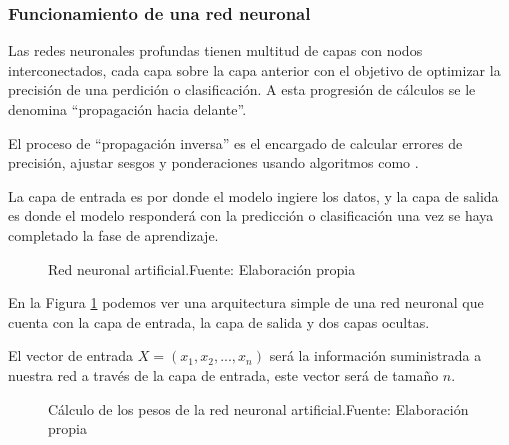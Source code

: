 


\subsubsection{Funcionamiento de una red neuronal} \label{neural-network}

Las redes neuronales profundas tienen multitud de capas con nodos interconectados, cada capa sobre la capa anterior con el objetivo de optimizar la precisión de una perdición o clasificación. A esta progresión de cálculos se le denomina ``propagación hacia delante''.

El proceso de ``propagación inversa'' es el encargado de calcular errores de precisión, ajustar sesgos y ponderaciones usando algoritmos como .

La capa de entrada es por donde el modelo ingiere los datos, y la capa de salida es donde el modelo responderá con la predicción o clasificación una vez se haya completado la fase de aprendizaje.

\begin{figure}[H]
    \centering
    \centerline{}
    \caption{Red neuronal artificial.\newline{}Fuente: Elaboración propia}
    \label{fig:artificial-neuronal-network}
\end{figure}

En la Figura \ref{fig:artificial-neuronal-network} podemos ver una arquitectura simple de una red neuronal que cuenta con la capa de entrada, la capa de salida y dos capas ocultas.

El vector de entrada ${X = (x_{1}, x_{2}, ..., x_{n})}$ será la información suministrada a nuestra red a través de la capa de entrada, este vector será de tamaño ${n}$.

\begin{figure}[H]
    \centering
    \captionsetup{justification=centering}
    \centerline{}
    \caption{Cálculo de los pesos de la red neuronal artificial.\newline{}Fuente: Elaboración propia}
    \label{fig:notation}
\end{figure}

